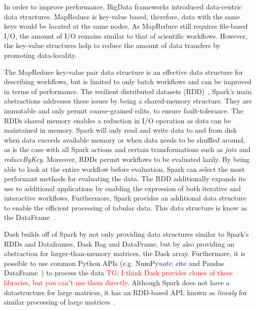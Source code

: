 \documentclass{report}
\newcommand{\note}[1]{\textcolor{blue}{\textit{note}: #1}}
\newcommand{\tristan}[1]{\textcolor{red}{TG: #1}}
\begin{document}
                In order to improve performance, BigData frameworks introduced
                data-centric data structures. MapReduce is key-value based, 
                therefore, data with the same keys would be located at the
                same nodes. As MapReduce still requires file-based I/O, the 
                amount of I/O remains similar to that of scientific workflows. 
                However, the key-value structures help to reduce the amount 
                of data transfers by promoting data-locality.

                The MapReduce key-value pair data structure is an effective 
                data structure for describing workflows, but is limited to only
                batch workflows and can be improved in terms of performance. 
                The resilient distributed datasets 
                (RDD)~\cite{Zaharia:2012:RDD:2228298.2228301}, Spark's main
                abstractions addresses these 
                issues by being a shared-memory structure. They 
                are immutable and only permit coarse-grained edits, to ensure 
                fault-tolerance. The RDDs shared memory enables a reduction in
                I/O operation as data can be maintained in memory. Spark will only read 
                and write data to and from disk when data exceeds available 
                memory or when data needs to be shuffled around, as is the case
                with all Spark actions and certain transformations such as 
                \textit{join} and \textit{reduceByKey}. Moreover, RDDs permit
                workflows to be evaluated lazily. By being able to look at the
                entire workflow before evaluation, Spark can select the most
                performant methods for evaluating the data. 
                The RDD additionally expands its use to additional applications
                by enabling the expression of both iterative and interactive
                workflows. Furthermore, Spark provides an additional data 
                structure to enable the efficient processing of tabular data.
                This data structure is know as the 
                DataFrame~\cite{Armbrust:2015:SSR:2723372.2742797}.

                Dask builds off of Spark by not only providing data 
                structures similar to Spark's RDDs and Dataframes, Dask Bag and 
                DataFrame, but by also providing an abstraction for 
                larger-than-memory matrices, the Dask array. Furthermore, it is
                possible to use common Python APIs (e.g. NumPy\note{cite} and 
                Pandas DataFrame~\cite{mckinney2011pandas}) to process the 
                data \tristan{I think Dask provides clones of these libraries, but you can't use
            them directly}. Although Spark does not have a datastructure for large 
                matrices, it has an RDD-based API, known as \textit{linealg}
                for similar processing of large 
                matrices~\cite{BosaghZadeh:2016:MCO:2939672.2939675}.
\end{document}

